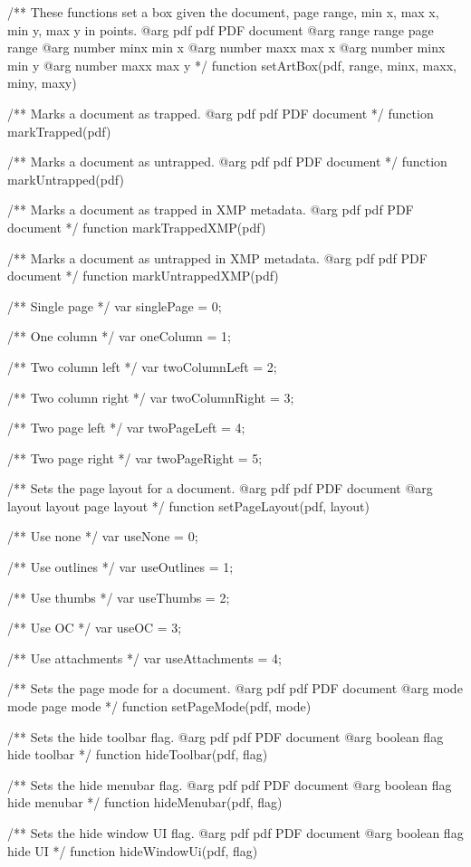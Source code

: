 /** These functions set a box given the document, page range, min x, max x,
min y, max y in points.
@arg {pdf} pdf PDF document
@arg {range} range page range
@arg {number} minx min x
@arg {number} maxx max x
@arg {number} minx min y
@arg {number} maxx max y */
function setArtBox(pdf, range, minx, maxx, miny, maxy) {}

/** Marks a document as trapped.
@arg {pdf} pdf PDF document */
function markTrapped(pdf) {}

/** Marks a document as untrapped.
@arg {pdf} pdf PDF document */
function markUntrapped(pdf) {}

/** Marks a document as trapped in XMP metadata.
@arg {pdf} pdf PDF document */
function markTrappedXMP(pdf) {}

/** Marks a document as untrapped in XMP metadata.
@arg {pdf} pdf PDF document */
function markUntrappedXMP(pdf) {}

/** Single page */
var singlePage = 0;

/** One column */
var oneColumn = 1;

/** Two column left */
var twoColumnLeft = 2;

/** Two column right */
var twoColumnRight = 3;

/** Two page left */
var twoPageLeft = 4;

/** Two page right */
var twoPageRight = 5;
  
/** Sets the page layout for a document.
@arg {pdf} pdf PDF document
@arg {layout} layout page layout */
function setPageLayout(pdf, layout) {}

/** Use none */
var useNone = 0;

/** Use outlines */
var useOutlines = 1;

/** Use thumbs */
var useThumbs = 2;

/** Use OC */
var useOC = 3;

/** Use attachments */
var useAttachments = 4;

/** Sets the page mode for a document.
@arg {pdf} pdf PDF document
@arg {mode} mode page mode */
function setPageMode(pdf, mode) {}

/** Sets the hide toolbar flag.
@arg {pdf} pdf PDF document
@arg {boolean} flag hide toolbar */
function hideToolbar(pdf, flag) {}

/** Sets the hide menubar flag.
@arg {pdf} pdf PDF document
@arg {boolean} flag hide menubar */
function hideMenubar(pdf, flag) {}

/** Sets the hide window UI flag.
@arg {pdf} pdf PDF document
@arg {boolean} flag hide UI */
function hideWindowUi(pdf, flag) {}

